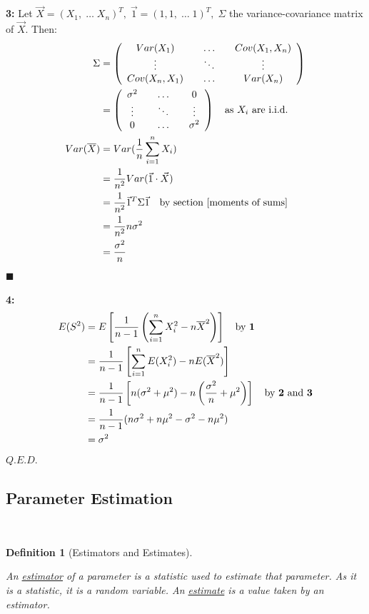 \documentclass[12pt,a4paper]{article}
\newtheorem{defn}[thm]{Definition}
\begin{document}
{\bf 3:} Let $\vec{X} = (X_1,\; \hdots\; X_n)^T,\; \vec{1} = (1,1,\; \hdots\; 1)^T,\; \Sigma$ the variance-covariance matrix of $\vec{X}$. Then:
\begin{align*}
\Sigma &= \left(\begin{array}{ccc} Var(X_1)\quad& \hdots\quad& Cov(X_1,X_n)\\ \vdots\quad & \ddots\quad & \vdots\\ Cov(X_n,X_1)\quad& \hdots\quad& Var(X_n)\end{array}\right)\\
&= \left(\begin{array}{ccc} \sigma^2\quad& \hdots\quad& 0\\ \vdots\quad & \ddots\quad & \vdots\\ 0\quad &\hdots\quad &\sigma^2\end{array}\right)\quad\mbox{as $X_i$ are i.i.d.}\\
Var(\overline{X}) &= Var(\frac{1}{n}\sum_{i=1}^n X_i)\\
&= \frac{1}{n^2}Var(\vec{1} \cdot \vec{X})\\
&= \frac{1}{n^2} \vec{1}^T\Sigma\vec{1}\quad\mbox{by section \ref{moments of sums}}\\
&= \frac{1}{n^2}n\sigma^2\\
&= \frac{\sigma^2}{n}
\end{align*}\hfill$\blacksquare$

{\bf 4:}
\begin{align*}
E(S^2) &= E\left[\frac{1}{n-1}\left(\sum_{i=1}^n X_i^2 -n\overline{X}^2\right)\right]\quad\mbox{by {\bf 1}}\\
&= \frac{1}{n-1}\left[\sum_{i=1}^n E(X_i^2) - nE(\overline{X}^2)\right]\\
&= \frac{1}{n-1}\left[n(\sigma^2 + \mu^2) - n\left(\frac{\sigma^2}{n} + \mu^2\right)\right]\quad\mbox{by {\bf 2} and {\bf 3}}\\
&= \frac{1}{n-1}(n\sigma^2 + n\mu^2 - \sigma^2 -n\mu^2)\\
&= \sigma^2
\end{align*}\hfill$Q.E.D.$

\subsection{Parameter Estimation}$\;$

\begin{defn}[Estimators and Estimates]$\;$\par\vspace{1cm}

An \underline{estimator} of a parameter is a statistic used to estimate that parameter. As it is a statistic, it is a random variable. An \underline{estimate} is a value taken by an estimator.

\end{defn}
\end{document}
